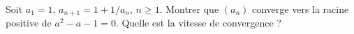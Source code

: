 Soit $a_1 = 1$, $a_{n+1} = 1 + 1/a_n$, $n \geq 1$. Montrer que $(a_n)$ converge vers la racine positive de $a^2 - a - 1 = 0$. Quelle est la vitesse de convergence ?
